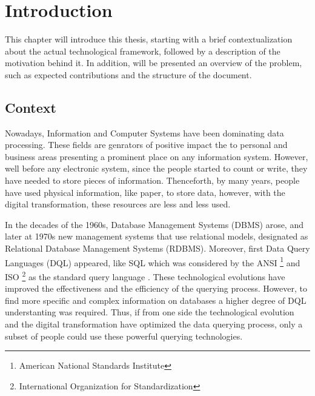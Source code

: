 \newcommand{\novathesis}{\emph{novathesis}}
\newcommand{\novathesisclass}{\texttt{novathesis.cls}}


\chapter{Introduction}
\label{cha:introduction}
This chapter will introduce this thesis, starting with a brief contextualization about the actual technological framework, followed by a description of the motivation behind it. In addition, will be presented an overview of the problem, such as expected contributions and the structure of the document. 

\section{Context} 
\label{sec:context}
Nowadays, Information and Computer Systems have been dominating data processing. These fields are genrators of positive impact the to personal and business areas presenting a prominent place on any information system. However, well before any electronic system, since the people started to count or write, they have needed to store pieces of information. \cite{historyOfDatabases} Thenceforth, by many years, people have used physical information, like paper, to store data, however, with the digital transformation, these resources are less and less used.

In the decades of the 1960s, Database Management Systems (DBMS) arose, and later at 1970s new management systems that use relational models, designated as Relational Database Management Systems (RDBMS). Moreover, first Data Query Languages (DQL) appeared, like SQL \cite{sequel_aStructuredEnglishQueryLanguage} which was considered by the ANSI \footnote{American National Standards Institute} and ISO \footnote{International Organization for Standardization} as the standard query language \cite{databaseManagementSystems}. These technological evolutions have improved the effectiveness and the efficiency of the querying process. However, to find more specific and complex information on databases  a higher degree of DQL understanting was required. Thus, if from one side the technological evolution and the digital transformation have optimized the data querying process, only a subset of people could use these powerful querying technologies.

